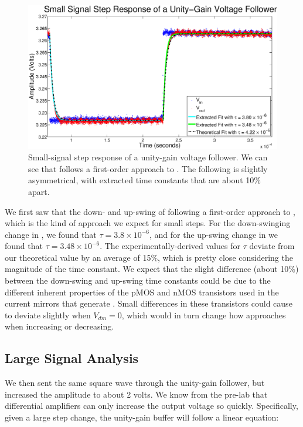 \begin{figure}[H]
\centering
\includegraphics[width=\linewidth]{../Figures/Exp3P2.eps}
\caption{Small-signal step response of a unity-gain voltage follower. We can see that \Vout follows a first-order approach to \Vin. The following is slightly asymmetrical, with extracted time constants that are about 10\% apart.}
\label{fig:exp3p2}
\end{figure}

We first saw that the down- and up-swing of \Vout following a first-order approach to \Vin, which is the kind of approach we expect for small steps. For the down-swinging change in \Vout, we found that $\tau = 3.8 \times 10^{-6}$, and for the up-swing change in \Vout we found that $\tau = 3.48 \times 10^{-6}$. The experimentally-derived values for $\tau$ deviate from our theoretical value by an average of 15\%, which is pretty close considering the magnitude of the time constant. We expect that the slight difference (about 10\%) between the down-swing and up-swing time constants could be due to the different inherent properties of the pMOS and nMOS transistors used in the current mirrors that generate \Vout. Small differences in these transistors could cause \Vout to deviate slightly when $V_{dm} = 0$, which would in turn change how \Vout approaches \Vin when increasing or decreasing.

\subsection*{Large Signal Analysis}


We then sent the same square wave through the unity-gain follower, but increased the amplitude to about 2 volts. We know from the pre-lab that differential amplifiers can only increase the output voltage so quickly. Specifically, given a large step change, the unity-gain buffer will follow a linear equation:

